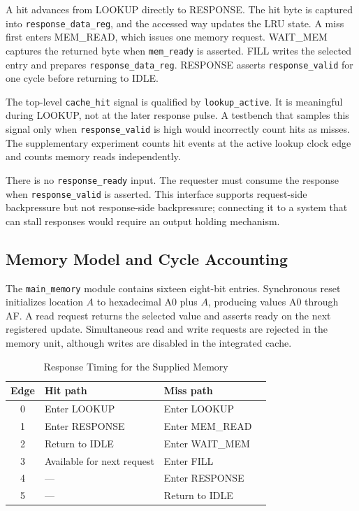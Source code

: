 \documentclass[conference]{IEEEtran}
\begin{document}
A hit advances from LOOKUP directly to RESPONSE. The hit byte is
captured into \texttt{response\_data\_reg}, and the accessed way updates
the LRU state. A miss first enters MEM\_READ, which issues one memory
request. WAIT\_MEM captures the returned byte when \texttt{mem\_ready}
is asserted. FILL writes the selected entry and prepares
\texttt{response\_data\_reg}. RESPONSE asserts \texttt{response\_valid}
for one cycle before returning to IDLE.

The top-level \texttt{cache\_hit} signal is qualified by
\texttt{lookup\_active}. It is meaningful during LOOKUP, not at the
later response pulse. A testbench that samples this signal only when
\texttt{response\_valid} is high would incorrectly count hits as misses.
The supplementary experiment counts hit events at the active lookup
clock edge and counts memory reads independently.

There is no \texttt{response\_ready} input. The requester must consume
the response when \texttt{response\_valid} is asserted. This interface
supports request-side backpressure but not response-side backpressure;
connecting it to a system that can stall responses would require an
output holding mechanism.

\subsection{Memory Model and Cycle Accounting}

The \texttt{main\_memory} module contains sixteen eight-bit entries.
Synchronous reset initializes location $A$ to hexadecimal A0 plus $A$,
producing values A0 through AF. A read request returns the selected
value and asserts ready on the next registered update. Simultaneous
read and write requests are rejected in the memory unit, although
writes are disabled in the integrated cache.

\begin{table}[!t]
\caption{Response Timing for the Supplied Memory}
\label{tab:timing}
\centering
\begin{tabular}{clll}
\toprule
Edge & Hit path & Miss path \\
\midrule
0 & Enter LOOKUP & Enter LOOKUP \\
1 & Enter RESPONSE & Enter MEM\_READ \\
2 & Return to IDLE & Enter WAIT\_MEM \\
3 & Available for next request & Enter FILL \\
4 & --- & Enter RESPONSE \\
5 & --- & Return to IDLE \\
\bottomrule
\end{tabular}
\end{table}
\end{document}
